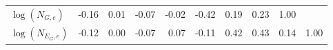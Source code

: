 \documentclass[unnumsec,webpdf,contemporary,large]{oup-authoring-template}%
\theoremstyle{thmstyleone}%
\theoremstyle{thmstyletwo}%
\theoremstyle{thmstylethree}%
\begin{document}
\begin{table}[!ht]
\begin{tabular}{l|rrrrrrrrr|}
$\log(N_{G,e})$            & -0.16                                                  & \hspace{0.29cm}0.01                                 & -0.07                                                 & -0.02                                               & -0.42                                                          & \hspace{0.29cm}0.19                                 & \hspace{0.29cm}0.23                                 & \hspace{0.29cm}1.00                                 &                                                        \\
$\log(N_{E_G,e})$          & -0.12                                                  & 0.00                                                & -0.07                                                 & \hspace{0.29cm}0.07                                 & -0.11                                                          & \hspace{0.29cm}0.42                                 & \hspace{0.29cm}0.43                                 & \hspace{0.29cm}0.14                                 & \hspace{0.29cm}1.00                                    \\ \hline
\end{tabular}
\label{tab:CorrM}
\end{table}
\end{document}
